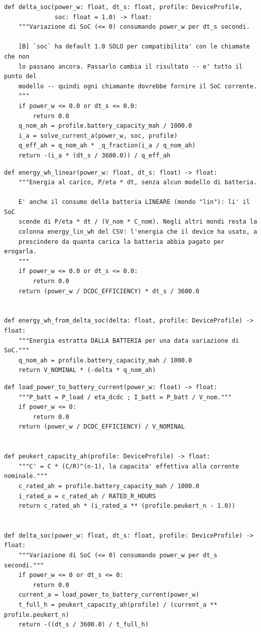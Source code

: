 \documentclass[11pt,a4paper]{article}
\begin{document}
\begin{lstlisting}[style=py,firstnumber=93,caption={\texttt{tesifl/device/battery\_model.py}, lines 93--159}]
def delta_soc(power_w: float, dt_s: float, profile: DeviceProfile,
              soc: float = 1.0) -> float:
    """Variazione di SoC (<= 0) consumando power_w per dt_s secondi.

    [B] `soc` ha default 1.0 SOLO per compatibilita' con le chiamate che non
    lo passano ancora. Passarlo cambia il risultato -- e' tutto il punto del
    modello -- quindi ogni chiamante dovrebbe fornire il SoC corrente.
    """
    if power_w <= 0.0 or dt_s <= 0.0:
        return 0.0
    q_nom_ah = profile.battery_capacity_mah / 1000.0
    i_a = solve_current_a(power_w, soc, profile)
    q_eff_ah = q_nom_ah * _q_fraction(i_a / q_nom_ah)
    return -(i_a * (dt_s / 3600.0)) / q_eff_ah
\end{lstlisting}

\begin{lstlisting}[style=py,firstnumber=173,caption={\texttt{tesifl/device/battery\_model.py}, lines 173--189}]
def energy_wh_linear(power_w: float, dt_s: float) -> float:
    """Energia al carico, P/eta * dt, senza alcun modello di batteria.

    E' anche il consumo della batteria LINEARE (mondo "lin"): li' il SoC
    scende di P/eta * dt / (V_nom * C_nom). Negli altri mondi resta la
    colonna energy_lin_wh del CSV: l'energia che il device ha usato, a
    prescindere da quanta carica la batteria abbia pagato per erogarla.
    """
    if power_w <= 0.0 or dt_s <= 0.0:
        return 0.0
    return (power_w / DCDC_EFFICIENCY) * dt_s / 3600.0


def energy_wh_from_delta_soc(delta: float, profile: DeviceProfile) -> float:
    """Energia estratta DALLA BATTERIA per una data variazione di SoC."""
    q_nom_ah = profile.battery_capacity_mah / 1000.0
    return V_NOMINAL * (-delta * q_nom_ah)
\end{lstlisting}

\begin{lstlisting}[style=py,firstnumber=29,caption={\texttt{tesifl/device/battery\_model\_peukert.py}, lines 29--49}]
def load_power_to_battery_current(power_w: float) -> float:
    """P_batt = P_load / eta_dcdc ; I_batt = P_batt / V_nom."""
    if power_w <= 0:
        return 0.0
    return (power_w / DCDC_EFFICIENCY) / V_NOMINAL


def peukert_capacity_ah(profile: DeviceProfile) -> float:
    """C' = C * (C/R)^(n-1), la capacita' effettiva alla corrente nominale."""
    c_rated_ah = profile.battery_capacity_mah / 1000.0
    i_rated_a = c_rated_ah / RATED_R_HOURS
    return c_rated_ah * (i_rated_a ** (profile.peukert_n - 1.0))


def delta_soc(power_w: float, dt_s: float, profile: DeviceProfile) -> float:
    """Variazione di SoC (<= 0) consumando power_w per dt_s secondi."""
    if power_w <= 0 or dt_s <= 0:
        return 0.0
    current_a = load_power_to_battery_current(power_w)
    t_full_h = peukert_capacity_ah(profile) / (current_a ** profile.peukert_n)
    return -((dt_s / 3600.0) / t_full_h)
\end{lstlisting}
\end{document}
